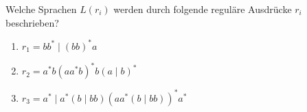 \begin{exercise}

Welche Sprachen $L(r_i)$ werden durch folgende reguläre
  Ausdrücke $r_i$ beschrieben?
\begin{enumerate}
  \item $r_1 = bb^*\mid (bb)^*a$
  \item $r_2 = a^*b(aa^*b)^*b(a\mid b)^*$
  \item $r_3 = a^*\mid a^*(b\mid bb)(aa^*(b\mid bb))^*a^*$
\end{enumerate}

\end{exercise}



